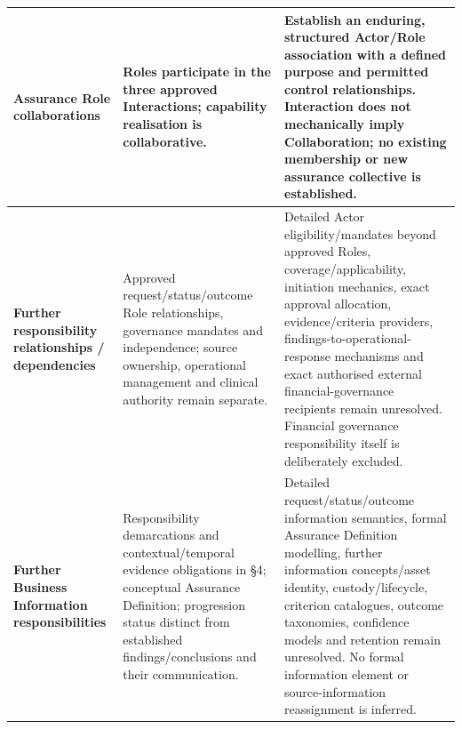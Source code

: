 \begin{longtable}{|>{\raggedright\arraybackslash}p{0.24\TableWidth}|>{\raggedright\arraybackslash}p{0.33\TableWidth}|>{\raggedright\arraybackslash}p{0.43\TableWidth}|}
\textbf{Assurance Role collaborations} & Roles participate in the three approved Interactions; capability realisation is collaborative. & Establish an enduring, structured Actor/\allowbreak{}Role association with a defined purpose and permitted control relationships. Interaction does not mechanically imply Collaboration; no existing membership or new assurance collective is established.\\\hline
\textbf{Further responsibility relationships /\allowbreak{} dependencies} & Approved request/\allowbreak{}status/\allowbreak{}outcome Role relationships, governance mandates and independence; source ownership, operational management and clinical authority remain separate. & Detailed Actor eligibility/\allowbreak{}mandates beyond approved Roles, coverage/\allowbreak{}applicability, initiation mechanics, exact approval allocation, evidence/\allowbreak{}criteria providers, findings-to-operational-response mechanisms and exact authorised external financial-governance recipients remain unresolved. Financial governance responsibility itself is deliberately excluded.\\\hline
\textbf{Further Business Information responsibilities} & Responsibility demarcations and contextual/\allowbreak{}temporal evidence obligations in §4; conceptual Assurance Definition; progression status distinct from established findings/\allowbreak{}conclusions and their communication. & Detailed request/\allowbreak{}status/\allowbreak{}outcome information semantics, formal Assurance Definition modelling, further information concepts/\allowbreak{}asset identity, custody/\allowbreak{}lifecycle, criterion catalogues, outcome taxonomies, confidence models and retention remain unresolved. No formal information element or source-information reassignment is inferred.\\\hline
\end{longtable}\endgroup
{}\label{rad:assurance:228}



\label{rad:assurance:230}
